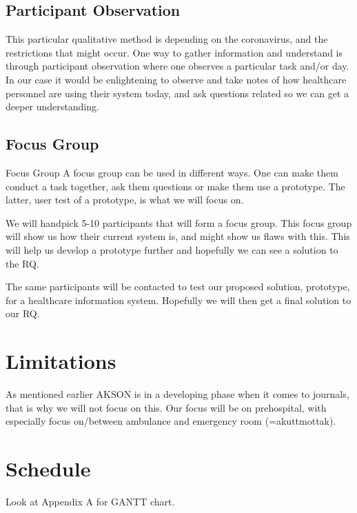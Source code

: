 \documentclass[fleqn,10pt]{wlscirep}
\begin{document}
\subsection{Participant Observation}

This particular qualitative method is depending on the coronavirus, and the restrictions that might occur. One way to gather information and understand is through participant observation where one observes a particular task and/or day\cite{M_Kilde18}. In our case it would be enlightening to observe and take notes of how healthcare personnel are using their system today, and ask questions related so we can get a deeper understanding.  
\subsection{Focus Group }
Focus Group 
A focus group can be used in different ways. One can make them conduct a task together, ask them questions or make them use a prototype\cite{M_Kilde18}. The latter, user test of a prototype, is what we will focus on. 

We will handpick 5-10 participants that will form a focus group. This focus group will show us how their current system is, and might show us flaws with this. This will help us develop a prototype further and hopefully we can see a solution to the RQ. 

The same participants will be contacted to test our proposed solution, prototype, for a healthcare information system. Hopefully we will then get a final solution to our RQ. 
\section{Limitations}

As mentioned earlier AKSON is in a developing phase when it comes to journals, that is why we will not focus on this. Our focus will be on prehospital, with especially focus on/between ambulance and emergency room (=akuttmottak). 
\section{Schedule}
Look at Appendix A for GANTT chart.



\newpage

\appendix
\renewcommand{\thesection}{\Alph{section}.\arabic{section}}
\setcounter{section}{0}

\begin{appendices}



\end{appendices}
\end{document}
